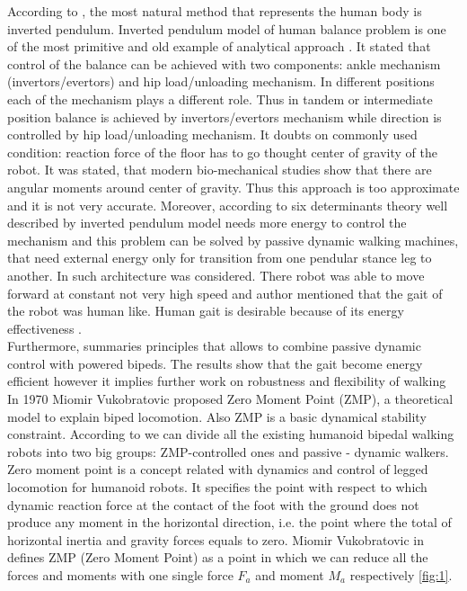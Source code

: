 \documentclass[11pt,a4paper]{report}
\begin{document}
According to \cite{tang2008analysis}, the most natural method that represents the human body is inverted pendulum.
Inverted pendulum model of human balance problem is one of the most primitive and old example of analytical approach \cite{winter1995human}. It stated that control of the balance can be achieved with two components: ankle mechanism (invertors/evertors) and hip load/unloading mechanism. In different positions each of the mechanism plays a different role. Thus in tandem or intermediate position balance is achieved by invertors/evertors mechanism while direction is controlled by hip load/unloading mechanism. It doubts on commonly used condition: reaction force of the floor has to go thought center of gravity of the robot. It was stated, that modern bio-mechanical studies show that there are angular moments around center of gravity. 
Thus this approach is too approximate and it is not very accurate.
Moreover, according to \cite{kuo2007six} six determinants theory\cite{inman1953major} well described by inverted pendulum model needs more energy to control the mechanism and this problem can be solved by passive dynamic walking machines, that need external energy only for transition from one pendular stance leg to another. In \cite{collins2005bipedal} such architecture was considered. There robot was able to move forward at constant not very high speed and author mentioned that the gait of the robot was human like. Human gait is desirable because of its energy effectiveness \cite{golliday1977approach}.\\
Furthermore, \cite{anderson2005powered} summaries principles that allows to combine passive dynamic control with powered bipeds. The results show that the gait become energy efficient however it implies further work on robustness and flexibility of walking\\

In 1970 Miomir Vukobratovic proposed Zero Moment Point (ZMP), a theoretical model to explain biped locomotion. Also ZMP is a basic dynamical stability constraint.
According to \cite{manchester2011stable} we can divide all the existing humanoid bipedal walking robots into two big groups: ZMP-controlled ones and passive - dynamic walkers.\\
Zero moment point is a concept related with dynamics and control of legged locomotion for humanoid robots. It specifies the point with respect to which dynamic reaction force at the contact of the foot with the ground does not produce any moment in the horizontal direction, i.e. the point where the total of horizontal inertia and gravity forces equals to zero.
Miomir Vukobratovic in \cite{vukobratovic2004zero} defines ZMP (Zero Moment Point) as a point in which we can reduce all the forces and moments with one single force $F_a$ and moment $M_a$ respectively  \cref{fig:1}.
	
\end{document}
